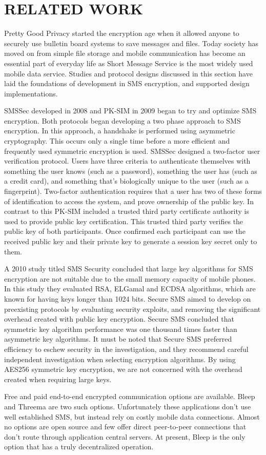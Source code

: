 \section{RELATED WORK}
Pretty Good Privacy \cite{pgp} started the encryption age when it allowed anyone to securely use bulletin board systems to save messages and files.
Today society has moved on from simple file storage and mobile communication has become an essential part of everyday life as Short Message Service is the most widely used mobile data service.
Studies and protocol designs discussed in this section have laid the foundations of development in SMS encryption, and supported design implementations.

SMSSec \cite{SMSSec} developed in 2008 and PK-SIM \cite{PkSim} in 2009 began to try and optimize SMS encryption.
Both protocols began developing a two phase approach to SMS encryption.
In this approach, a handshake is performed using asymmetric cryptography.
This occurs only a single time before a more efficient and frequently used symmetric encryption is used.
SMSSec designed a two-factor user verification protocol.
Users have three criteria to authenticate themselves with something the user knows (such as a password), something the user has (such as a credit card), and something that's biologically unique to the user (such as a fingerprint).
Two-factor authentication requires that a user has two of these forms of identification to access the system, and prove ownership of the public key.
In contrast to this PK-SIM included a trusted third party certificate authority is used to provide public key certification.
This trusted third party verifies the public key of both participants.
Once confirmed each participant can use the received public key and their private key to generate a session key secret only to them.

A 2010 study titled SMS Security \cite{SmsSecurity} concluded that large key algorithms for SMS encryption are not suitable due to the small memory capacity of mobile phones.
In this study they evaluated RSA, ELGamal and ECDSA algorithms, which are known for having keys longer than 1024 bits.
Secure SMS \cite{SecureSms} aimed to develop on preexisting protocols by evaluating security exploits, and removing the significant overhead created with public key encryption.
Secure SMS concluded that symmetric key algorithm performance was one thousand times faster than asymmetric key algorithms.
It must be noted that Secure SMS preferred efficiency to eschew security in the investigation, and they recommend careful independent investigation when selecting encryption algorithms.
By using AES256 symmetric key encryption, we are not concerned with the overhead created when requiring large keys.

Free and paid end-to-end encrypted communication options are available.
Bleep \cite{bleep} and Threema \cite{threema} are two such options.
Unfortunately these applications don’t use well established SMS, but instead rely on costly mobile data connections.
Almost no options are open source and few offer direct peer-to-peer connections that don’t route through application central servers.
At present, Bleep is the only option that has a truly decentralized operation.


